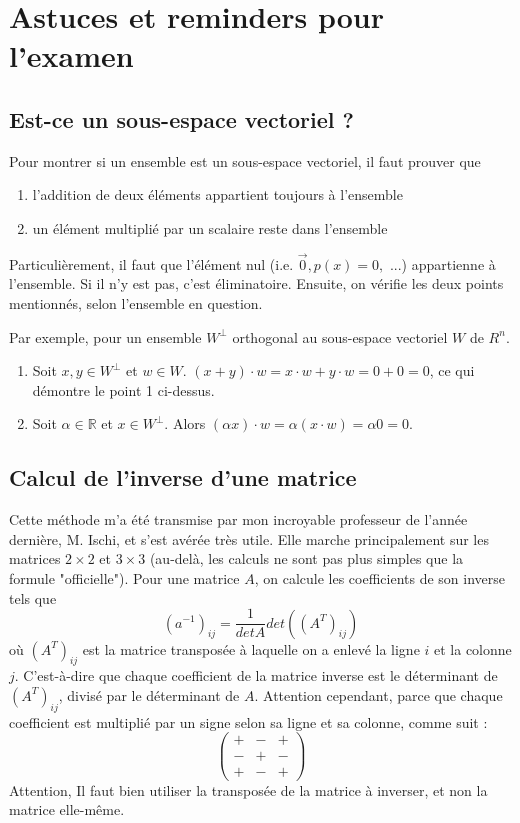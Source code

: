 \documentclass[10pt,a4paper]{book}
\newcommand{\R}{\mathbb{R}}
\begin{document}
\chapter{Astuces et reminders pour l'examen}
\section{Est-ce un sous-espace vectoriel ?}
Pour montrer si un ensemble est un sous-espace vectoriel, il faut prouver que
\begin{enumerate}
\item l'addition de deux éléments appartient toujours à l'ensemble
\item un élément multiplié par un scalaire reste dans l'ensemble
\end{enumerate}
Particulièrement, il faut que l'élément nul (i.e. $\overrightarrow{0}, p(x)=0,$ ...) appartienne à l'ensemble. Si il n'y est pas, c'est éliminatoire. Ensuite, on vérifie les deux points mentionnés, selon l'ensemble en question.\par 
Par exemple, pour un ensemble $W^\bot$ orthogonal au sous-espace vectoriel $W$ de $R^n$. 
\begin{enumerate}
\item Soit $x,y\in W^\bot$ et $w\in W$. $(x+y)\cdot w=x\cdot w+y\cdot w=0+0=0$, ce qui démontre le point 1 ci-dessus.
\item Soit $\alpha\in\R$ et $x\in W^\bot$. Alors $(\alpha x)\cdot w=\alpha(x\cdot w)=\alpha0=0$.
\end{enumerate}

\section{Calcul de l'inverse d'une matrice}
Cette méthode m'a été transmise par mon incroyable professeur de l'année dernière, M. Ischi, et s'est avérée très utile. Elle marche principalement sur les matrices $2\times 2$ et $3\times 3$ (au-delà, les calculs ne sont pas plus simples que la formule "officielle"). Pour une matrice $A$, on calcule les coefficients de son inverse tels que 
\[(a^{-1})_{ij} = \dfrac{1}{detA} det((A^T)_{ij})\]
où $(A^T)_{ij}$ est la matrice transposée à laquelle on a enlevé la ligne $i$ et la colonne $j$. C'est-à-dire que chaque coefficient de la matrice inverse est le déterminant de $(A^T)_{ij}$, divisé par le déterminant de $A$. Attention cependant, parce que chaque coefficient est multiplié par un signe selon sa ligne et sa colonne, comme suit :
\[\begin{pmatrix}
 + & - & +\\
 - & + & -\\
 + & - & +
\end{pmatrix}\]
Attention, Il faut bien utiliser la transposée de la matrice à inverser, et non la matrice elle-même.
\end{document}
